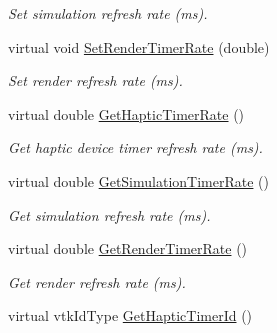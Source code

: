 \begin{DoxyCompactItemize}
\begin{DoxyCompactList}\small\item\em Set simulation refresh rate (ms). \item\end{DoxyCompactList}\item 
\hypertarget{classvtkSimulation_aa1a090f42a6a9481a409cb7e6d922190}{
virtual void \hyperlink{classvtkSimulation_aa1a090f42a6a9481a409cb7e6d922190}{SetRenderTimerRate} (double)}
\label{classvtkSimulation_aa1a090f42a6a9481a409cb7e6d922190}

\begin{DoxyCompactList}\small\item\em Set render refresh rate (ms). \item\end{DoxyCompactList}\item 
\hypertarget{classvtkSimulation_aa443586b59c480f8fea169f907190b27}{
virtual double \hyperlink{classvtkSimulation_aa443586b59c480f8fea169f907190b27}{GetHapticTimerRate} ()}
\label{classvtkSimulation_aa443586b59c480f8fea169f907190b27}

\begin{DoxyCompactList}\small\item\em Get haptic device timer refresh rate (ms). \item\end{DoxyCompactList}\item 
\hypertarget{classvtkSimulation_ae77325783a54b547467b4fd78245cd27}{
virtual double \hyperlink{classvtkSimulation_ae77325783a54b547467b4fd78245cd27}{GetSimulationTimerRate} ()}
\label{classvtkSimulation_ae77325783a54b547467b4fd78245cd27}

\begin{DoxyCompactList}\small\item\em Get simulation refresh rate (ms). \item\end{DoxyCompactList}\item 
\hypertarget{classvtkSimulation_a5e5129a11e682509eecb31d746dcbb8c}{
virtual double \hyperlink{classvtkSimulation_a5e5129a11e682509eecb31d746dcbb8c}{GetRenderTimerRate} ()}
\label{classvtkSimulation_a5e5129a11e682509eecb31d746dcbb8c}

\begin{DoxyCompactList}\small\item\em Get render refresh rate (ms). \item\end{DoxyCompactList}\item 
\hypertarget{classvtkSimulation_ab8b51013eb3e5c895b92eade3b51d68f}{
virtual vtkIdType \hyperlink{classvtkSimulation_ab8b51013eb3e5c895b92eade3b51d68f}{GetHapticTimerId} ()}
\label{classvtkSimulation_ab8b51013eb3e5c895b92eade3b51d68f}


\end{DoxyCompactItemize}
